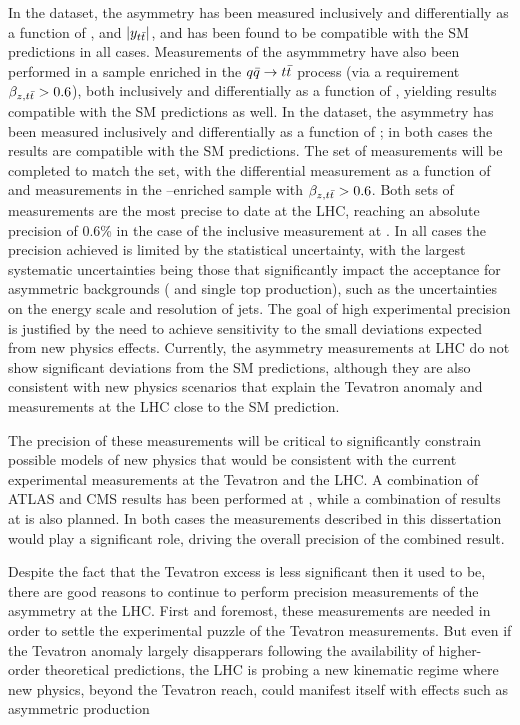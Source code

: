 In the \seventev{} dataset, the asymmetry \ac{} has been measured
inclusively and differentially as a function of \mtt{}, \pttt{} and $|y_{t\bar{t}}{}|$, and has been found
to be compatible with the SM predictions in all cases. 
Measurements of the asymmmetry have also been performed in a sample enriched in 
the $q\bar{q}{}\to t\bar{t}{}$ process (via a requirement $\beta_{z,t\bar{t}}{}>0.6$), both
inclusively and differentially as a function of \mtt{}, yielding
results compatible with the SM predictions as well. 
In the \eighttev{} dataset, the asymmetry \ac{} has been measured
inclusively and differentially as a function of \mtt{}; in both cases the results are
compatible with the SM predictions. The set of measurements will be
completed to match the \seventev{} set, with the differential
measurement as a function of \pttt{} and measurements in the
\qqbar{}--enriched sample with $\beta_{z,t\bar{t}}{}>0.6$.
Both sets of measurements are the most precise to date at the LHC,
reaching an absolute precision of 0.6\% in the case of the inclusive measurement
at \eighttev{}. In all cases the precision achieved is limited by the statistical 
uncertainty, with the largest systematic uncertainties being those that significantly
impact the acceptance for asymmetric backgrounds (\wjets{} and
single top production), such as the uncertainties on the energy scale and
resolution of jets.
The goal of high experimental precision is justified by the need to achieve
sensitivity to the small deviations expected from new physics effects.
Currently, the asymmetry measurements at LHC do not show
significant deviations from the SM predictions, although they are also
consistent with new physics scenarios that explain the Tevatron
anomaly and \ac{} measurements at the LHC close to the SM prediction.

The precision of these measurements will be critical to significantly
constrain possible models of new physics that would be consistent with
the current experimental measurements at the Tevatron and the LHC. 
A combination of ATLAS and CMS results has been performed at
\seventev{}, while a combination of results at \eighttev{} is also planned.
In both cases the measurements described in this dissertation would play
a significant role, driving the overall precision of the combined result.

Despite the fact that the Tevatron excess is less significant then it used to be, 
there are good reasons to continue to perform precision measurements of the 
asymmetry at the LHC. First and foremost, these measurements are needed in order
to settle the experimental puzzle of the Tevatron measurements. But even 
if the Tevatron anomaly largely disapperars following the availability of higher-order
theoretical predictions, the LHC is probing a new kinematic regime where new physics,
beyond the Tevatron reach, could manifest itself with effects such as asymmetric 
\ttbar{} production

